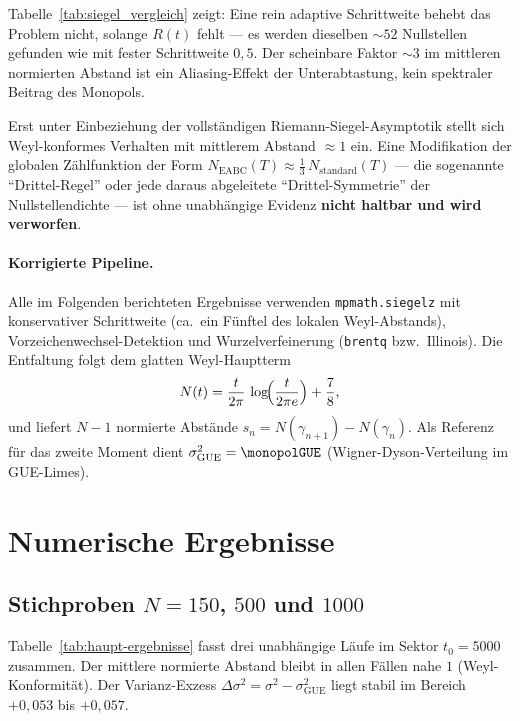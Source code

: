 \documentclass[11pt,a4paper]{article}
\newcommand{\badCountInterval}{52}
\begin{document}
Tabelle~\ref{tab:siegel_vergleich} zeigt: Eine rein adaptive Schrittweite behebt das
Problem nicht, solange $R(t)$ fehlt --- es werden dieselben $\sim\badCountInterval$ Nullstellen
gefunden wie mit fester Schrittweite $0{,}5$.
Der scheinbare Faktor $\sim 3$ im mittleren normierten Abstand ist ein
Aliasing-Effekt der Unterabtastung, kein spektraler Beitrag des Monopols.

Erst unter Einbeziehung der vollständigen Riemann-Siegel-Asymptotik stellt sich
Weyl-konformes Verhalten mit mittlerem Abstand $\approx 1$ ein.
Eine Modifikation der globalen Zählfunktion der Form
$N_{\mathrm{EABC}}(T) \approx \tfrac{1}{3}\,N_{\mathrm{standard}}(T)$
--- die sogenannte ``Drittel-Regel'' oder jede daraus abgeleitete
``Drittel-Symmetrie'' der Nullstellendichte ---
ist ohne unabhängige Evidenz \textbf{nicht haltbar und wird verworfen}.

\paragraph{Korrigierte Pipeline.}
Alle im Folgenden berichteten Ergebnisse verwenden \texttt{mpmath.siegelz} mit
konservativer Schrittweite (ca.\ ein Fünftel des lokalen Weyl-Abstands),
Vorzeichenwechsel-Detektion und Wurzelverfeinerung (\texttt{brentq} bzw.\ Illinois).
Die Entfaltung folgt dem glatten Weyl-Hauptterm
\begin{equation}
  N(t) = \frac{t}{2\pi}\,\log\!\Bigl(\frac{t}{2\pi e}\Bigr) + \frac{7}{8},
  \label{eq:weyl-unfold}
\end{equation}
und liefert $N-1$ normierte Abstände $s_n = N(\gamma_{n+1}) - N(\gamma_n)$.
Als Referenz für das zweite Moment dient $\sigma^2_{\mathrm{GUE}} = \monopolGUE$
(Wigner-Dyson-Verteilung im GUE-Limes).

\section{Numerische Ergebnisse}
\label{sec:numerische-ergebnisse}

\subsection{Stichproben $N=150$, $500$ und $1000$}

Tabelle~\ref{tab:haupt-ergebnisse} fasst drei unabhängige Läufe im Sektor
$t_0=5000$ zusammen. Der mittlere normierte Abstand bleibt in allen Fällen
nahe $1$ (Weyl-Konformität). Der Varianz-Exzess $\Delta\sigma^2 = \sigma^2 - \sigma^2_{\mathrm{GUE}}$
liegt stabil im Bereich $+0{,}053$ bis $+0{,}057$.
\end{document}

